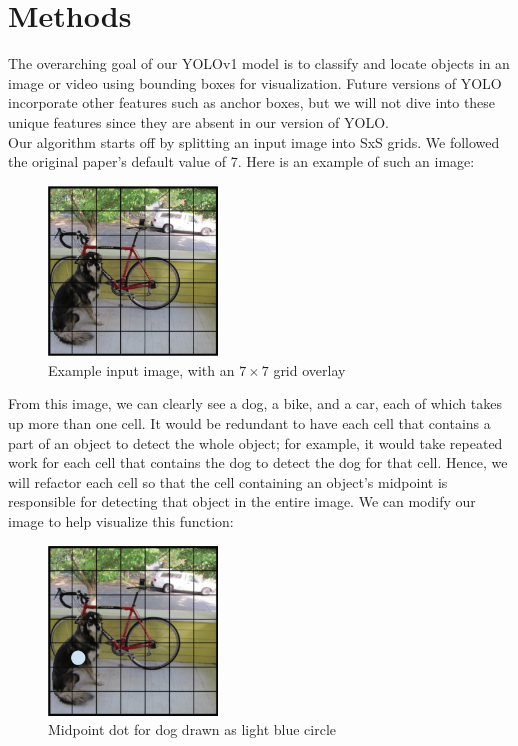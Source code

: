\documentclass{article}
\begin{document}
\section{Methods}

The overarching goal of our YOLOv1 model is to classify and locate objects in an image or video using bounding boxes for visualization. Future versions of YOLO incorporate other features such as anchor boxes, but we will not dive into these unique features since they are absent in our version of YOLO. \\

Our algorithm starts off by splitting an input image into SxS grids. We followed the original paper's default value of 7. Here is an example of such an image:

\begin{figure}[H]
  \centering
  \includegraphics[width=0.4\textwidth]{Images/Grid.png}
  \caption{Example input image, with an \(7 \times 7\) grid overlay}
  \label{fig:example}
\end{figure}

From this image, we can clearly see a dog, a bike, and a car, each of which takes up more than one cell. It would be redundant to have each cell that contains a part of an object to detect the whole object; for example, it would take repeated work for each cell that contains the dog to detect the dog for that cell. Hence, we will refactor each cell so that the cell containing an object's midpoint is responsible for detecting that object in the entire image. We can modify our image to help visualize this function:

\begin{figure}[H]
  \centering
  \includegraphics[width=0.4\textwidth]{Images/Grid_dot.png}
  \caption{Midpoint dot for dog drawn as light blue circle}
  \label{fig:example}
\end{figure}
\end{document}
